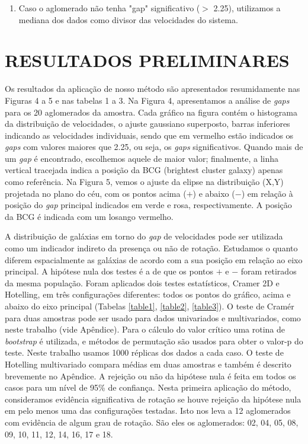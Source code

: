 \documentclass[12pt,fleqn]{article}
\begin{document}
{\begin{enumerate}
\item Caso o aglomerado não tenha "gap" significativo ($>$ 2.25), utilizamos a
mediana dos dados como divisor das velocidades do sistema.


\end{enumerate}

\newpage

\section{RESULTADOS PRELIMINARES}


Os resultados da aplicação de nosso método são apresentados
resumidamente nas Figuras 4 a 5 e nas tabelas 1 a 3. Na Figura 4, apresentamos
a análise de {\it gaps} para os 20 aglomerados da amostra. Cada gráfico na
figura contém o histograma da distribuição de velocidades, o ajuste gaussiano superposto,
barras inferiores indicando as velocidades individuais, sendo que em vermelho estão
indicados os {\it gaps} com valores maiores que 2.25, ou seja, os {\it gaps} significativos.
Quando mais de um {\it gap} é encontrado, escolhemos aquele de maior valor; finalmente,
a linha vertical tracejada indica a posição da BCG (brightest cluster galaxy) apenas
como referência. Na Figura 5, vemos o ajuste da elipse na distribuição (X,Y) projetada
no plano do céu, com os pontos acima ($+$) e abaixo ($-$) em relação à posição do \textit{gap} principal
 indicados em verde e rosa, respectivamente.
A posição da BCG é indicada com um losango vermelho.

A distribuição de galáxias em torno do {\it gap} de velocidades pode ser utilizada como um indicador indireto da presença ou não de rotação. Estudamos o quanto diferem espacialmente as galáxias de acordo com a sua posição em relação ao eixo principal. A hipótese nula dos testes é a de que os pontos $+$ e $-$ foram retirados da mesma população. Foram aplicados dois testes estatísticos, Cramer 2D e Hotelling, em três configurações diferentes: todos os pontos do gráfico, acima e abaixo do eixo principal (Tabelas \ref{table1}, \ref{table2}, \ref{table3}). O teste de Cramér para duas amostras pode ser usado para dados univariados e multivariados, 
como neste trabalho (vide Apêndice). Para o cálculo
do valor crítico uma rotina de {\it bootstrap} é utilizada, e métodos de permutação são usados para obter o valor-p do teste.
Neste trabalho usamos 1000 réplicas dos dados a cada caso. O teste de Hotelling multivariado compara médias em duas
amostras e também é descrito brevemente no Apêndice. A rejeição ou não da hipótese nula é feita em todos os casos
para um nível de 95\% de confiança. Nesta primeira aplicação do método, consideramos evidência significativa
de rotação se houve rejeição da hipótese nula em pelo menos uma das configurações testadas. Isto nos leva
a 12 aglomerados com evidência de algum grau de rotação. São eles os aglomerados: 02, 04, 05, 08, 09, 10, 11,
12, 14, 16, 17 e 18.

}
\end{document}
